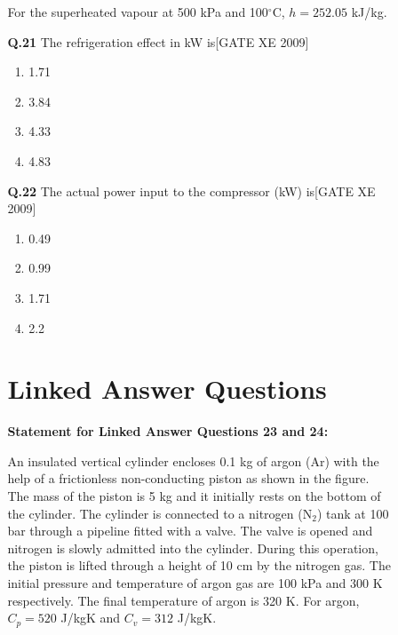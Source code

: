 \documentclass[journal,12pt,onecolumn]{IEEEtran}
\theoremstyle{remark}
\begin{document}
\begin{enumerate}
\begin{enumerate}
\begin{enumerate}
\noindent
For the superheated vapour at 500 kPa and 100$^\circ$C, $h = 252.05$ kJ/kg.

\item[\textbf{Q.21}]The refrigeration effect in kW is\hfill[GATE XE 2009]
\begin{multicols}{2}
\begin{enumerate}
    \item 1.71
    \item 3.84
    \item 4.33
    \item 4.83
\end{enumerate}
\end{multicols}

\vspace{0.3cm}

\item[\textbf{Q.22}] The actual power input to the compressor (kW) is\hfill[GATE XE 2009]
\begin{multicols}{2}
\begin{enumerate}
    \item 0.49
    \item 0.99
    \item 1.71
    \item 2.2
\end{enumerate}
\end{multicols}

\vspace{0.3cm}
\section*{Linked Answer Questions}

\textbf{Statement for Linked Answer Questions 23 and 24:}

An insulated vertical cylinder encloses 0.1 kg of argon (Ar) with the help of a frictionless non-conducting piston as shown in the figure. The mass of the piston is 5 kg and it initially rests on the bottom of the cylinder. The cylinder is connected to a nitrogen (N$_2$) tank at 100 bar through a pipeline fitted with a valve. The valve is opened and nitrogen is slowly admitted into the cylinder. During this operation, the piston is lifted through a height of 10 cm by the nitrogen gas. The initial pressure and temperature of argon gas are 100 kPa and 300 K respectively. The final temperature of argon is 320 K. For argon, $C_p = 520$ J/kgK and $C_v = 312$ J/kgK.



\end{enumerate}
\end{enumerate}
\end{enumerate}
\end{document}
